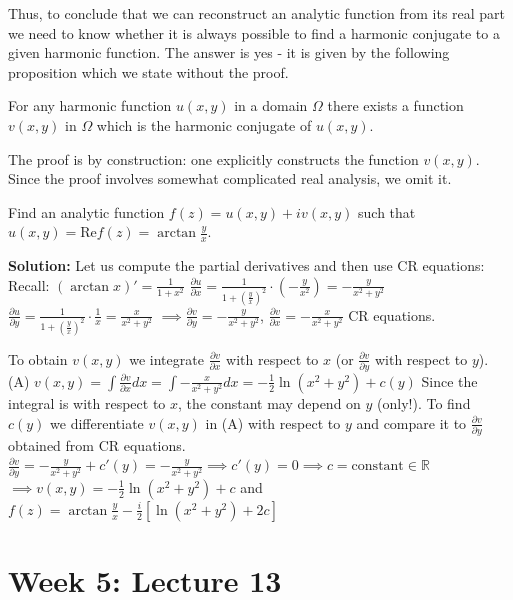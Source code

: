 \documentclass[12pt]{article}
\newcommand{\Rea}{\text{Re}}
\begin{document}
Thus, to conclude that we can reconstruct an analytic function from its real part we need to know whether it is always possible to find a harmonic conjugate to a given harmonic function. The answer is yes - it is given by the following proposition which we state without the proof.

\begin{proposition}
For any harmonic function $u(x,y)$ in a domain $\Omega$ there exists a function $v(x,y)$ in $\Omega$ which is the harmonic conjugate of $u(x,y)$.
\end{proposition}

The proof is by construction: one explicitly constructs the function $v(x,y)$. Since the proof involves somewhat complicated real analysis, we omit it.

\begin{example}
Find an analytic function $f(z) = u(x,y) + iv(x,y)$ such that $u(x,y) = \Rea f(z) = \arctan\frac{y}{x}$.

\textbf{Solution:} Let us compute the partial derivatives and then use CR equations: Recall: $(\arctan x)' = \frac{1}{1+x^2}$
$\frac{\partial u}{\partial x} = \frac{1}{1+(\frac{y}{x})^2} \cdot (-\frac{y}{x^2}) = -\frac{y}{x^2+y^2}$
$\frac{\partial u}{\partial y} = \frac{1}{1+(\frac{y}{x})^2} \cdot \frac{1}{x} = \frac{x}{x^2+y^2}$
$\implies \frac{\partial v}{\partial y} = -\frac{y}{x^2+y^2}$, $\frac{\partial v}{\partial x} = -\frac{x}{x^2+y^2}$ CR equations.

To obtain $v(x,y)$ we integrate $\frac{\partial v}{\partial x}$ with respect to $x$ (or $\frac{\partial v}{\partial y}$ with respect to $y$).
(A) $v(x,y) = \int \frac{\partial v}{\partial x} dx = \int -\frac{x}{x^2+y^2} dx = -\frac{1}{2}\ln(x^2 + y^2) + c(y)$
Since the integral is with respect to $x$, the constant may depend on $y$ (only!). To find $c(y)$ we differentiate $v(x,y)$ in (A) with respect to $y$ and compare it to $\frac{\partial v}{\partial y}$ obtained from CR equations.
$\frac{\partial v}{\partial y} = -\frac{y}{x^2+y^2} + c'(y) = -\frac{y}{x^2+y^2} \implies c'(y) = 0 \implies c = \text{constant} \in \mathbb{R}$
$\implies v(x,y) = -\frac{1}{2}\ln(x^2 + y^2) + c$ and $f(z) = \arctan\frac{y}{x} - \frac{i}{2}[\ln(x^2 + y^2) + 2c]$
\end{example}

\section{Week 5: Lecture 13}
\end{document}
